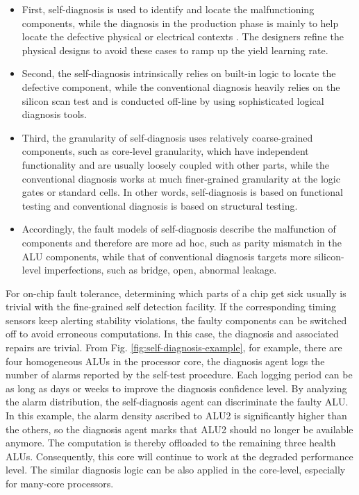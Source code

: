 \begin{itemize}
\item First, self-diagnosis is used to identify and locate the malfunctioning components, while the diagnosis in the production phase is mainly to help locate the defective physical or electrical contexts \cite{aitken2012yield}. The designers refine the physical designs to avoid these cases to ramp up the yield learning rate.

\item Second, the self-diagnosis intrinsically relies on built-in logic to locate the defective component, while the conventional diagnosis heavily relies on the silicon scan test and is conducted off-line by using sophisticated logical diagnosis tools.

\item Third, the granularity of self-diagnosis uses relatively coarse-grained components, such as core-level granularity, which have independent functionality and are usually loosely coupled with other parts, while the conventional diagnosis works at much finer-grained granularity at the logic gates or standard cells. In other words, self-diagnosis is based on functional testing and conventional diagnosis is based on structural testing.

\item Accordingly, the fault models of self-diagnosis describe the malfunction of components and therefore are more ad hoc, such as parity mismatch in the ALU components, while that of conventional diagnosis targets more silicon-level imperfections, such as bridge, open, abnormal leakage.
\end{itemize}

For on-chip fault tolerance, determining which parts of a chip get sick usually is trivial with the fine-grained self detection facility. If the corresponding timing sensors keep alerting stability violations, the faulty components can be switched off to avoid erroneous computations. In this case, the diagnosis and associated repairs are trivial. From Fig. \ref{fig:self-diagnosis-example}, for example, there are four homogeneous ALUs in the processor core, the diagnosis agent logs the number of alarms reported by the self-test procedure. Each logging period can be as long as days or weeks to improve the diagnosis confidence level. By analyzing the alarm distribution, the self-diagnosis agent can discriminate the faulty ALU. In this example, the alarm density ascribed to ALU2 is significantly higher than the others, so the diagnosis agent marks that ALU2 should no longer be available anymore. The computation is thereby offloaded to the remaining three health ALUs. Consequently, this core will continue to work at the degraded performance level. The similar diagnosis logic can be also applied in the core-level, especially for many-core processors.

